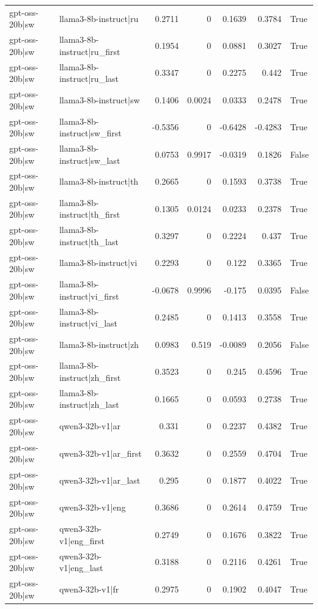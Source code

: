 \begin{table}
\begin{tabular}{l l r r r r l}
gpt-oss-20b|sw & llama3-8b-instruct|ru & 0.2711 & 0 & 0.1639 & 0.3784 & True \\
gpt-oss-20b|sw & llama3-8b-instruct|ru_first & 0.1954 & 0 & 0.0881 & 0.3027 & True \\
gpt-oss-20b|sw & llama3-8b-instruct|ru_last & 0.3347 & 0 & 0.2275 & 0.442 & True \\
gpt-oss-20b|sw & llama3-8b-instruct|sw & 0.1406 & 0.0024 & 0.0333 & 0.2478 & True \\
gpt-oss-20b|sw & llama3-8b-instruct|sw_first & -0.5356 & 0 & -0.6428 & -0.4283 & True \\
gpt-oss-20b|sw & llama3-8b-instruct|sw_last & 0.0753 & 0.9917 & -0.0319 & 0.1826 & False \\
gpt-oss-20b|sw & llama3-8b-instruct|th & 0.2665 & 0 & 0.1593 & 0.3738 & True \\
gpt-oss-20b|sw & llama3-8b-instruct|th_first & 0.1305 & 0.0124 & 0.0233 & 0.2378 & True \\
gpt-oss-20b|sw & llama3-8b-instruct|th_last & 0.3297 & 0 & 0.2224 & 0.437 & True \\
gpt-oss-20b|sw & llama3-8b-instruct|vi & 0.2293 & 0 & 0.122 & 0.3365 & True \\
gpt-oss-20b|sw & llama3-8b-instruct|vi_first & -0.0678 & 0.9996 & -0.175 & 0.0395 & False \\
gpt-oss-20b|sw & llama3-8b-instruct|vi_last & 0.2485 & 0 & 0.1413 & 0.3558 & True \\
gpt-oss-20b|sw & llama3-8b-instruct|zh & 0.0983 & 0.519 & -0.0089 & 0.2056 & False \\
gpt-oss-20b|sw & llama3-8b-instruct|zh_first & 0.3523 & 0 & 0.245 & 0.4596 & True \\
gpt-oss-20b|sw & llama3-8b-instruct|zh_last & 0.1665 & 0 & 0.0593 & 0.2738 & True \\
gpt-oss-20b|sw & qwen3-32b-v1|ar & 0.331 & 0 & 0.2237 & 0.4382 & True \\
gpt-oss-20b|sw & qwen3-32b-v1|ar_first & 0.3632 & 0 & 0.2559 & 0.4704 & True \\
gpt-oss-20b|sw & qwen3-32b-v1|ar_last & 0.295 & 0 & 0.1877 & 0.4022 & True \\
gpt-oss-20b|sw & qwen3-32b-v1|eng & 0.3686 & 0 & 0.2614 & 0.4759 & True \\
gpt-oss-20b|sw & qwen3-32b-v1|eng_first & 0.2749 & 0 & 0.1676 & 0.3822 & True \\
gpt-oss-20b|sw & qwen3-32b-v1|eng_last & 0.3188 & 0 & 0.2116 & 0.4261 & True \\
gpt-oss-20b|sw & qwen3-32b-v1|fr & 0.2975 & 0 & 0.1902 & 0.4047 & True \\

\end{tabular}
\end{table}
